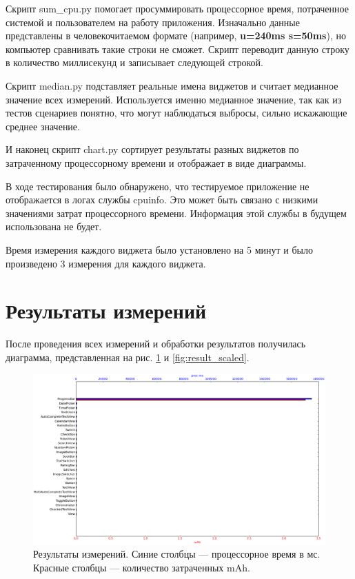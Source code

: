\documentclass[a4paper,14pt]{extarticle} %
\begin{document}
	Скрипт sum\_cpu.py помогает просуммировать процессорное время, потраченное системой и пользователем на работу приложения. Изначально данные представлены в человекочитаемом формате (например, \textbf{u=240ms s=50ms}), но компьютер сравнивать такие строки не сможет. Скрипт переводит данную строку в количество миллисекунд и записывает следующей строкой.
	
	Скрипт median.py подставляет реальные имена виджетов и считает медианное значение всех измерений. Используется именно медианное значение, так как из тестов сценариев понятно, что могут наблюдаться выбросы, сильно искажающие среднее значение. 
	
	И наконец скрипт chart.py сортирует результаты разных виджетов по затраченному процессорному времени и отображает в виде диаграммы.
	
	В ходе тестирования было обнаружено, что тестируемое приложение не отображается в логах службы cpuinfo. Это может быть связано с низкими значениями затрат процессорного времени. Информация этой службы в будущем использована не будет.
	
	Время измерения каждого виджета было установлено на 5 минут и было произведено 3 измерения для каждого виджета.
	
	\newpage
	\section{Результаты измерений}
	
	После проведения всех измерений и обработки результатов получилась диаграмма, представленная на рис. \ref{fig:result} и \ref{fig:result_scaled}.
	
	\begin{figure}[!htb]
		\includegraphics[width=\textwidth]{result}
		\caption{Результаты измерений. Синие столбцы --- процессорное время в мс. Красные столбцы --- количество затраченных mAh.}
		\label{fig:result}
	\end{figure}
\end{document}
